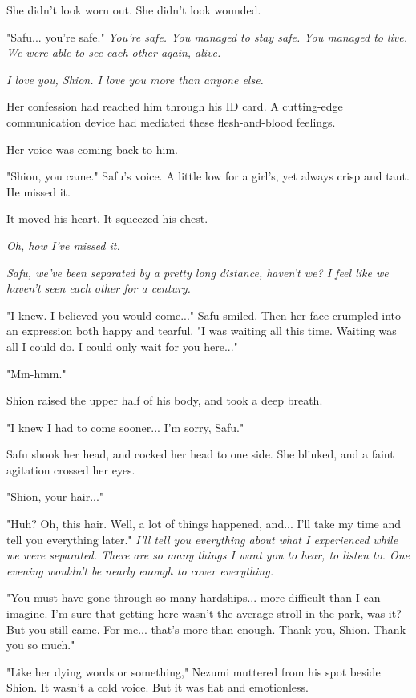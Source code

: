 She didn't look worn out. She didn't look wounded.

"Safu... you're safe." \emph{You're safe. You managed to stay safe. You
	managed to live. We were able to see each other again, alive.}

\emph{I love you, Shion. I love you more than anyone else.}

Her confession had reached him through his ID card. A cutting-edge
communication device had mediated these flesh-and-blood feelings.

Her voice was coming back to him.

"Shion, you came." Safu's voice. A little low for a girl's, yet always
crisp and taut. He missed it.

It moved his heart. It squeezed his chest.

\emph{Oh, how I've missed it.}

\emph{Safu, we've been separated by a pretty long distance, haven't we? I feel
	like we haven't seen each other for a century.}

"I knew. I believed you would come..." Safu smiled. Then her face
crumpled into an expression both happy and tearful. "I was waiting all
this time. Waiting was all I could do. I could only wait for you
here..."

"Mm-hmm."

Shion raised the upper half of his body, and took a deep breath.

"I knew I had to come sooner... I'm sorry, Safu."

Safu shook her head, and cocked her head to one side. She blinked, and a
faint agitation crossed her eyes.

"Shion, your hair..."

"Huh? Oh, this hair. Well, a lot of things happened, and... I'll take my
time and tell you everything later." \emph{I'll tell you everything about what
	I experienced while we were separated. There are so many things I want
	you to hear, to listen to. One evening wouldn't be nearly enough to
	cover everything.}

"You must have gone through so many hardships... more difficult than I
can imagine. I'm sure that getting here wasn't the average stroll in the
park, was it? But you still came. For me... that's more than enough.
Thank you, Shion. Thank you so much."

"Like her dying words or something," Nezumi muttered from his spot
beside Shion. It wasn't a cold voice. But it was flat and emotionless.


